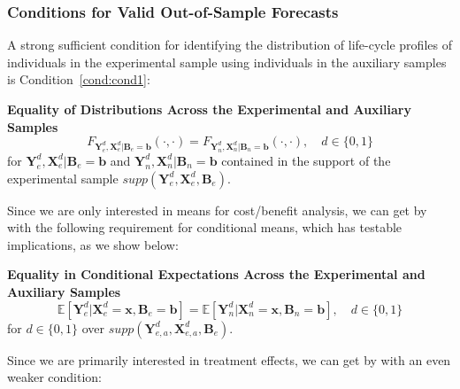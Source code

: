 \subsubsection{Conditions for Valid Out-of-Sample Forecasts}

A strong sufficient condition for identifying the distribution of life-cycle profiles of individuals in the experimental sample using individuals in the auxiliary samples is Condition~\ref{cond:cond1}:

\onehalfspacing
\begin{condition} \textbf{Equality of Distributions Across the Experimental and Auxiliary Samples \label{cond:cond1}}
\begin{equation}
F_{\bm{Y}_e^d, \bm{X}_e^d | \bm{B}_e = \bm{b}} \left( \cdot, \cdot \right) = F_{\bm{Y}_n^d, \bm{X}_n^d | \bm{B}_n = \bm{b}} \left( \cdot, \cdot \right), \quad d \in \{0,1\}
\end{equation}
\noindent for $\bm{Y}_e^d, \bm{X}^d_e | \bm{B}_e = \bm{b}$ and $\bm{Y}_n^d, \bm{X}^d_n | \bm{B}_n = \bm{b}$ contained in the support of the experimental sample $supp\left(\bm{Y}^d_{e}, \bm{X}^d_{e}, \bm{B}_{e} \right)$.
\end{condition}
\doublespacing

Since we are only interested in means for cost/benefit analysis, we can get by with the following requirement for conditional means, which has testable implications, as we show below:

\onehalfspacing
\begin{condition} \textbf{Equality in Conditional Expectations Across the Experimental and Auxiliary Samples \label{cond:cond2}}
\begin{equation}
\mathbb{E} \left[ \bm{Y}_e^d |  \bm{X}_e^d = \bm{x}, \bm{B}_e = \bm{b} \right] = \mathbb{E} \left[ \bm{Y}_n^d |  \bm{X}_n^d = \bm{x}, \bm{B}_n = \bm{b} \right], \quad d \in \{0,1\}
\end{equation}
for $d \in \{0, 1 \}$ over $supp\left(\bm{Y}^d_{e,a}, \bm{X}^d_{e,a}, \bm{B}_e\right)$.
\end{condition}
\doublespacing

Since we are primarily interested in treatment effects, we can get by with an even weaker condition:

